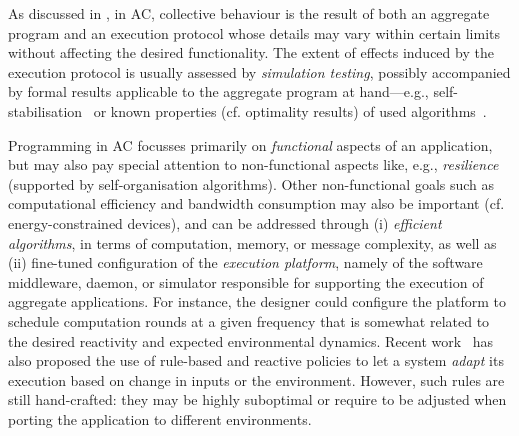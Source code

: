 As discussed in ,
 in \ac{AC}, collective behaviour 
 is the result of both
 an aggregate program
 and an execution protocol
 whose details may vary within certain limits
 without affecting the desired functionality.
%
The extent of effects induced by the execution protocol
 is usually assessed by \emph{simulation testing},
 possibly accompanied by formal results applicable to the aggregate program at hand---e.g., self-stabilisation~\cite{DBLP:journals/tomacs/ViroliABDP18}
  or known properties (cf. optimality results) of used algorithms~\cite{DBLP:conf/saso/AudritoCDV17,DBLP:journals/cee/AudritoCDPV21}.

Programming in \ac{AC}
 focusses primarily on \emph{functional} aspects of an application,
 but may also pay special attention to non-functional aspects like, e.g., \emph{resilience} (supported by self-organisation algorithms).
%
Other non-functional goals such as computational efficiency and bandwidth consumption may also be important (cf. energy-constrained devices), 
 and can be addressed through (i) \emph{efficient algorithms}, in terms of computation, memory, or message complexity,
 as well as 
 (ii) fine-tuned configuration of the \emph{execution platform}, namely of the software middleware, daemon, or simulator responsible for supporting the execution of aggregate applications. 
%
%
%
For instance, the designer could configure the platform 
 to schedule computation rounds 
 at a given frequency
 that is somewhat related to the desired reactivity
 and expected environmental dynamics.
%
Recent work~\cite{danilo2021lmcs} has also proposed the use of rule-based and reactive policies to let a system \emph{adapt} its execution based on change in inputs or the environment.
%
However, such rules are still hand-crafted: they may be highly suboptimal or require to be adjusted when porting the application to different environments.
%

%
% 

